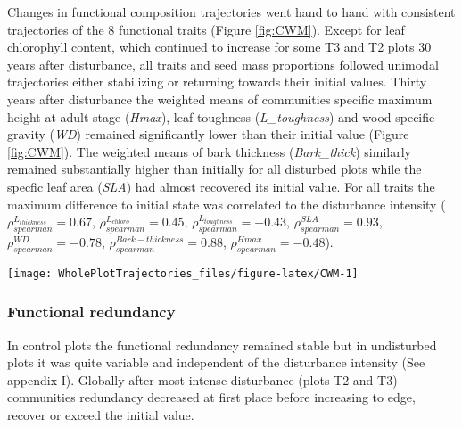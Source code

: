 \documentclass[fleqn,10pt]{ArtEcoFoG} %
\theoremstyle{definition}
\theoremstyle{definition}
\theoremstyle{definition}
\theoremstyle{remark}
\begin{document}
Changes in functional composition trajectories went hand to hand with
consistent trajectories of the 8 functional traits (Figure
\ref{fig:CWM}). Except for leaf chlorophyll content, which continued to
increase for some T3 and T2 plots 30 years after disturbance, all traits
and seed mass proportions followed unimodal trajectories either
stabilizing or returning towards their initial values. Thirty years
after disturbance the weighted means of communities specific maximum
height at adult stage (\emph{Hmax}), leaf toughness
(\emph{L\_toughness}) and wood specific gravity (\emph{WD}) remained
significantly lower than their initial value (Figure \ref{fig:CWM}). The
weighted means of bark thickness (\emph{Bark\_thick}) similarly remained
substantially higher than initially for all disturbed plots while the
specfic leaf area (\emph{SLA}) had almost recovered its initial value.
For all traits the maximum difference to initial state was correlated to
the disturbance intensity (\(\rho_{spearman}^{L_{thickness}}=0.67\),
\(\rho_{spearman}^{L_{chloro}}=0.45\),
\(\rho_{spearman}^{L_{toughness}}=-0.43\),
\(\rho_{spearman}^{SLA}=0.93\), \(\rho_{spearman}^{WD}=-0.78\),
\(\rho_{spearman}^{Bark-thickness}=0.88\),
\(\rho_{spearman}^{Hmax}=-0.48\)).

\begin{figure*}

{\centering \texttt{[image: WholePlotTrajectories\_files/figure-latex/CWM-1]} 

}

\caption{Trajectories of the communities weighted means (CWM) over 30 years after disturbance of 4 leaf traits (Leaf thickness, \emph{L\_thickness}, chlorophyll content, \emph{L\_chloro}, toughness, \emph{L\_toughness} and specific area, \emph{SLA}), 2 stem traits (wood specific gravity, \emph{WD}, and bark thickness, \emph{Bark-thick}) and one life history trait (Specific maximum height at adult stage, \emph{Hmax}). Colors are treatments: green (control), blue (T1), orange (T2), red (T3) with shaded areas the credibility intervals.}\label{fig:CWM}
\end{figure*}

\subsubsection{Functional redundancy}\label{functional-redundancy}

In control plots the functional redundancy remained stable but in
undisturbed plots it was quite variable and independent of the
disturbance intensity (See appendix I). Globally after most intense
disturbance (plots T2 and T3) communities redundancy decreased at first
place before increasing to edge, recover or exceed the initial value.
\end{document}
